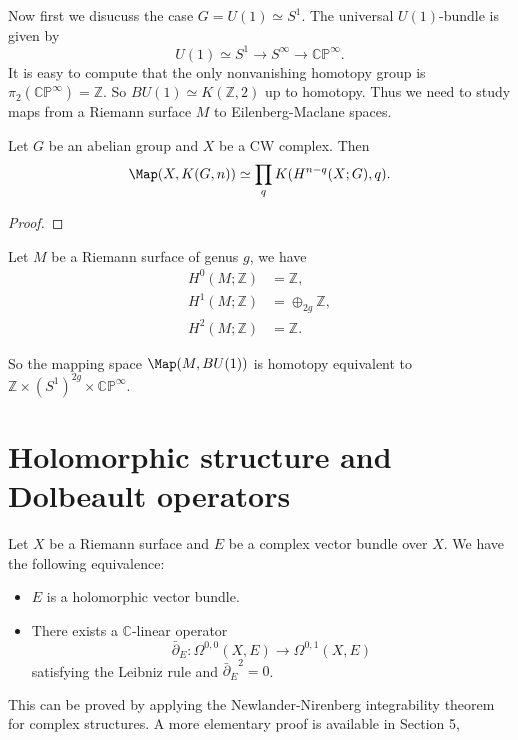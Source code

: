 Now first we disucuss the case \(G=U(1)\simeq S^1\). The universal \(U(1)\)-bundle is given by 
\[U(1)\simeq S^1\rightarrow S^\infty\rightarrow \mathbb{C}\mathbb{P}^\infty.\]
It is easy to compute that the only nonvanishing homotopy group is \(\pi_2(\mathbb{C}\mathbb{P}^\infty)=\mathbb{Z}\). So \(BU(1)\simeq K(\mathbb{Z},2)\) up to homotopy. Thus we need to study maps from a Riemann surface \(M\) to Eilenberg-Maclane spaces.

\begin{theorem}
     Let \(G\) be an abelian group and \(X\) be a CW complex. Then 
     \[\Map(X,K(G,n))\simeq \prod_q K(H^{n-q}(X;G),q).\]
\end{theorem}

\begin{proof}
    
\end{proof}

Let \(M\) be a Riemann surface of genus \(g\), we have 
\begin{align*}
     H^0(M;\mathbb{Z})&=\mathbb{Z},\\
     H^1(M;\mathbb{Z})&=\oplus_{2g} \mathbb{Z},\\
     H^2(M;\mathbb{Z})&=\mathbb{Z}.
\end{align*}

So the mapping space \(\Map(M,BU(1))\) is homotopy equivalent to \(\mathbb{Z}\times (S^1)^{2g}\times \mathbb{C}\mathbb{P}^\infty\).




\section{Holomorphic structure and Dolbeault operators}

Let \(X\) be a Riemann surface and \(E\) be a complex vector bundle over \(X\). We have the following equivalence:
\begin{itemize}
     \item \(E\) is a holomorphic vector bundle.
     \item There exists a \(\mathbb{C}\)-linear operator 
     \[\bar{\partial}_E:\Omega^{0,0}(X,E)\rightarrow \Omega^{0,1}(X,E)\]
     satisfying the Leibniz rule and \({\bar{\partial}_E}^2=0\).
\end{itemize}

This can be proved by applying the Newlander-Nirenberg integrability theorem for complex structures. A more elementary proof is available in \cite{atiyahYangMillsEquationsRiemann1983}{Section 5}, 
